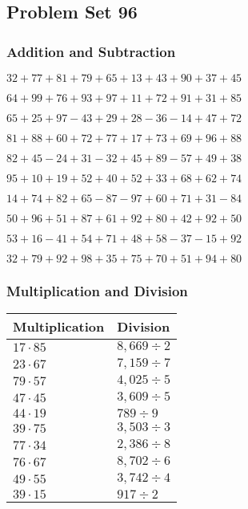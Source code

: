 \hypertarget{problem-set-96}{%
\subsection{Problem Set 96}\label{problem-set-96}}

\hypertarget{addition-and-subtraction}{%
\subsubsection{Addition and
Subtraction}\label{addition-and-subtraction}}

\(32+77+81+79+65+13+43+90+37+45\)

\(64+99+76+93+97+11+72+91+31+85\)

\(65+25+97-43+29+28-36-14+47+72\)

\(81+88+60+72+77+17+73+69+96+88\)

\(82+45-24+31-32+45+89-57+49+38\)

\(95+10+19+52+40+52+33+68+62+74\)

\(14+74+82+65-87-97+60+71+31-84\)

\(50+96+51+87+61+92+80+42+92+50\)

\(53+16-41+54+71+48+58-37-15+92\)

\(32+79+92+98+35+75+70+51+94+80\)

\hypertarget{multiplication-and-division}{%
\subsubsection{Multiplication and
Division}\label{multiplication-and-division}}

\begin{longtable}[]{@{}ll@{}}
\toprule
Multiplication & Division\tabularnewline
\midrule
\endhead
\(17\cdot85\) & \(8,669÷2\)\tabularnewline
\(23\cdot67\) & \(7,159÷7\)\tabularnewline
\(79\cdot57\) & \(4,025÷5\)\tabularnewline
\(47\cdot45\) & \(3,609÷5\)\tabularnewline
\(44\cdot19\) & \(789÷9\)\tabularnewline
\(39\cdot75\) & \(3,503÷3\)\tabularnewline
\(77\cdot34\) & \(2,386÷8\)\tabularnewline
\(76\cdot67\) & \(8,702÷6\)\tabularnewline
\(49\cdot55\) & \(3,742÷4\)\tabularnewline
\(39\cdot15\) & \(917÷2\)\tabularnewline
\bottomrule
\end{longtable}
